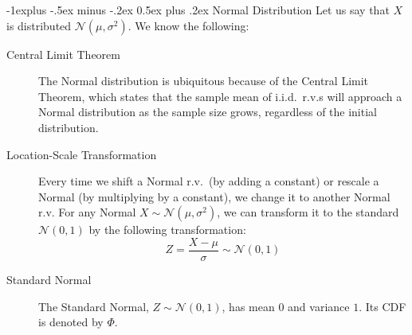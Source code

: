 \documentclass[6pt, landscape]{article}
\makeatletter
\renewcommand{\subsection}{\@startsection{subsection}{2}{0mm}%
                                {-1explus -.5ex minus -.2ex}%
                                {0.5ex plus .2ex}%
                                {\small\bfseries}}
\renewcommand{\N}{\mathcal{N}}
\makeatother
\begin{document}
\begin{multicols}{3}
\begin{description}

        \end{description}

        \subsection{Normal Distribution} Let us say that $X$ is distributed $\N(\mu, \sigma^2)$. We know the following:
        \begin{description}
                \item[Central Limit Theorem] The Normal distribution is ubiquitous because of the Central Limit Theorem, which states that the sample mean of i.i.d.~r.v.s will approach a Normal distribution as the sample size grows, regardless of the initial distribution.
                \item[Location-Scale Transformation] Every time we shift a Normal r.v.~(by adding a constant) or rescale a Normal (by multiplying by a constant), we change it to another Normal r.v. For any Normal $X \sim \N(\mu, \sigma^2)$, we can transform it to the standard $\N(0, 1)$ by the following transformation:
                      \[Z= \frac{X - \mu}{\sigma} \sim \N(0, 1) \]
                \item[Standard Normal] The Standard Normal, $Z \sim \N(0, 1)$, has mean $0$ and variance $1$. Its CDF is denoted by $\Phi$.
        \end{description}


\end{multicols}
\end{document}
